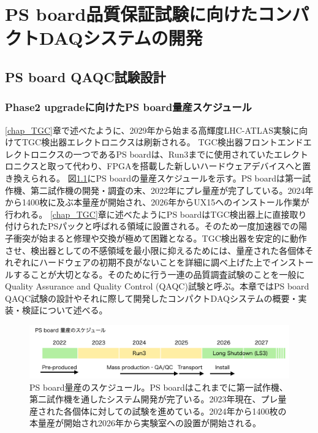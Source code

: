 \chapter{PS board品質保証試験に向けたコンパクトDAQシステムの開発}
\label{chap_QAQC}

\section{PS board QAQC試験設計}
\label{sec_QAQCdesign}
\subsection{Phase2 upgradeに向けたPS board量産スケジュール}
\ref{chap_TGC}章で述べたように、2029年から始まる高輝度LHC-ATLAS実験に向けてTGC検出器エレクトロニクスは刷新される。
TGC検出器フロントエンドエレクトロニクスの一つであるPS boardは、Run3までに使用されていたエレクトロニクスと取って代わり、FPGAを搭載した新しいハードウェアデバイスへと置き換えられる。
図\ref{PSBschedule}にPS boardの量産スケジュールを示す。PS boardは第一試作機、第二試作機の開発・調査の末、2022年にプレ量産が完了している。2024年から1400枚に及ぶ本量産が開始され、2026年からUX15へのインストール作業が行われる。
\ref{chap_TGC}章に述べたようにPS boardはTGC検出器上に直接取り付けられたPSパックと呼ばれる領域に設置される。そのため一度加速器での陽子衝突が始まると修理や交換が極めて困難となる。TGC検出器を安定的に動作させ、検出器としての不感領域を最小限に抑えるためには、量産された各個体それぞれにハードウェアの初期不良がないことを詳細に調べ上げた上でインストールすることが大切となる。そのために行う一連の品質調査試験のことを一般にQuality Assurance and Quality Control (QAQC)試験と呼ぶ。本章ではPS board QAQC試験の設計やそれに際して開発したコンパクトDAQシステムの概要・実装・検証について述べる。

\begin{figure} 
\centering
\includegraphics[width=14cm]{fig/PSBschedule.png}
\caption[PS board量産のスケジュール]{PS board量産のスケジュール。PS boardはこれまでに第一試作機、第二試作機を通したシステム開発が完了いる。2023年現在、プレ量産された各個体に対しての試験を進めている。2024年から1400枚の本量産が開始され2026年から実験室への設置が開始される。}
\label{PSBschedule}
\end{figure}

